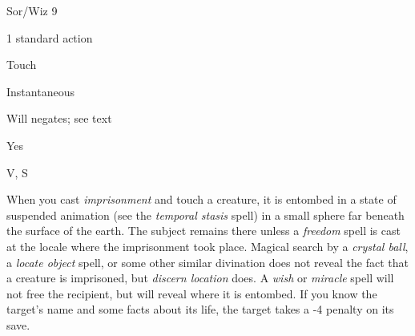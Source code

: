 
\begin{description*}
\item[Level:] Sor/Wiz 9
\item[Casting Time:] 1 standard action
\item[Range:] Touch
\item[Duration:] Instantaneous
\item[Saving Throw:] Will negates; see text
\item[Spell Resistance:] Yes
\item[Components:] V, S
\end{description*}

When you cast \textit{imprisonment} and touch a creature, it is entombed in a state
of suspended animation (see the \textit{temporal stasis} spell) in a small sphere
far beneath the surface of the earth. The subject remains there unless a \textit{freedom
}spell is cast at the locale where the imprisonment took place. Magical search
by a \textit{crystal ball}, a \textit{locate object} spell, or some other similar
divination does not reveal the fact that a creature is imprisoned, but \textit{discern
location} does. A \textit{wish} or \textit{miracle} spell will not free the recipient,
but will reveal where it is entombed. If you know the target's name and some facts
about its life, the target takes a -4 penalty on its save.